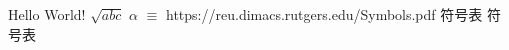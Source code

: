 \documentclass{article}
\begin{document}
  Hello World! $\sqrt{abc}$
  $\alpha$
  $\equiv$ 
   https://reu.dimacs.rutgers.edu/Symbols.pdf 符号表
   符号表
\end{document}
